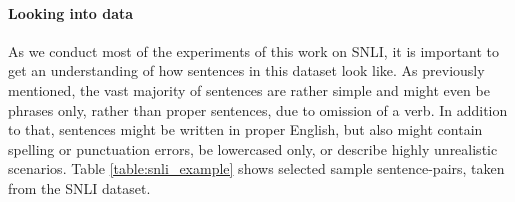 \paragraph*{Looking into data}
As we conduct most of the experiments of this work on \ac{SNLI}, it is important to get an understanding of how sentences in this dataset look like. As previously mentioned, the vast majority of sentences are rather simple and might even be phrases only, rather than proper sentences, due to omission of a verb. In addition to that, sentences might be written in proper English, but also might contain spelling or punctuation errors, be lowercased only, or describe highly unrealistic scenarios.  Table \ref{table:snli_example} shows selected sample sentence-pairs, taken from the \ac{SNLI} dataset.
\begin{center}
\begin{table}[htt]
\begin{center}
\end{center}
\caption{Example sentence pairs, taken from \ac{SNLI}, showing typical sentences within the dataset.}
\label{table:snli_example}
\end{table}
\end{center}
